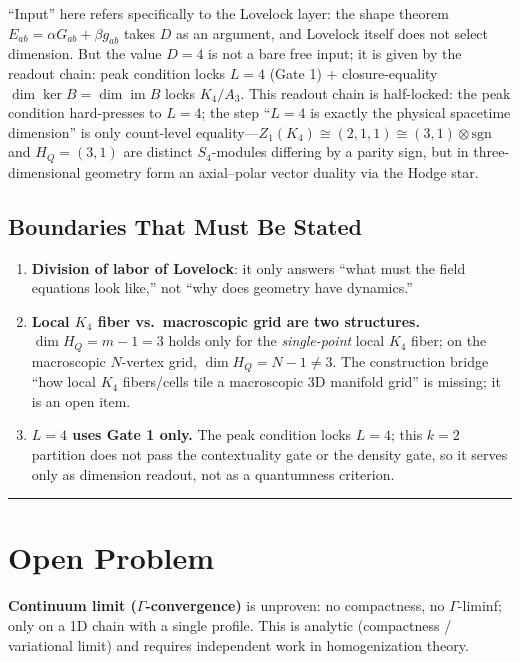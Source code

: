 \documentclass[
  11pt,
]{article}
\providecommand{\tightlist}{%
  \setlength{\itemsep}{0pt}\setlength{\parskip}{0pt}}
\begin{document}
``Input'' here refers specifically to the Lovelock layer: the shape
theorem \(E_{ab}=\alpha G_{ab}+\beta g_{ab}\) takes \(D\) as an
argument, and Lovelock itself does not select dimension. But the value
\(D=4\) is not a bare free input; it is given by the readout chain: peak
condition locks \(L=4\) (Gate 1) + closure-equality
\(\dim\ker B=\dim\operatorname{im}B\) locks \(K_4/A_3\). This readout
chain is half-locked: the peak condition hard-presses to \(L=4\); the
step ``\(L=4\) is exactly the physical spacetime dimension'' is only
count-level
equality---\(Z_1(K_4)\cong(2,1,1)\cong(3,1)\otimes\mathrm{sgn}\) and
\(H_Q=(3,1)\) are distinct \(S_4\)-modules differing by a parity sign,
but in three-dimensional geometry form an axial--polar vector duality
via the Hodge star.

\subsection{Boundaries That Must Be
Stated}\label{boundaries-that-must-be-stated}

\begin{enumerate}
\def\labelenumi{\arabic{enumi}.}
\tightlist
\item
  \textbf{Division of labor of Lovelock}: it only answers ``what must
  the field equations look like,'' not ``why does geometry have
  dynamics.''
\item
  \textbf{Local \(K_4\) fiber vs.~macroscopic grid are two structures.}
  \(\dim H_Q=m-1=3\) holds only for the \emph{single-point} local
  \(K_4\) fiber; on the macroscopic \(N\)-vertex grid,
  \(\dim H_Q=N-1\ne3\). The construction bridge ``how local \(K_4\)
  fibers/cells tile a macroscopic 3D manifold grid'' is missing; it is
  an open item.
\item
  \textbf{\(L=4\) uses Gate 1 only.} The peak condition locks \(L=4\);
  this \(k=2\) partition does not pass the contextuality gate or the
  density gate, so it serves only as dimension readout, not as a
  quantumness criterion.
\end{enumerate}

\begin{center}\rule{0.5\linewidth}{0.5pt}\end{center}

\section{Open Problem}\label{open-problem}

\textbf{Continuum limit (\(\Gamma\)-convergence)} is unproven: no
compactness, no \(\Gamma\)-liminf; only on a 1D chain with a single
profile. This is analytic (compactness / variational limit) and requires
independent work in homogenization theory.
\end{document}
